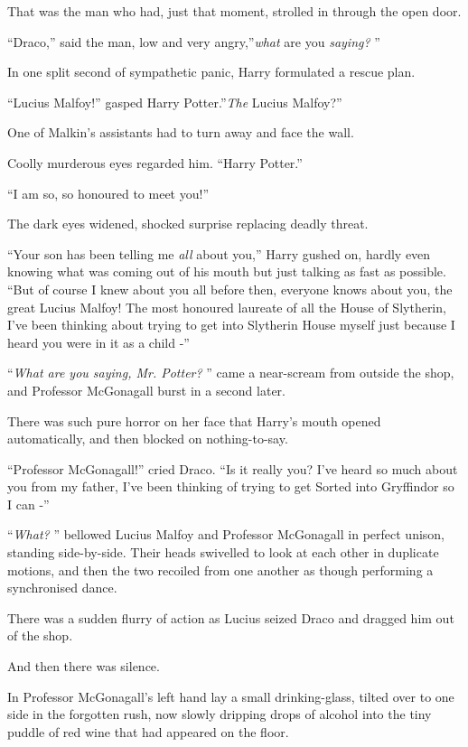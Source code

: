 That was the man who had, just that moment, strolled in through the open
door.

``Draco,'' said the man, low and very angry,''\emph{what} are you
\emph{saying?} ''

In one split second of sympathetic panic, Harry formulated a rescue
plan.

``Lucius Malfoy!'' gasped Harry Potter.''\emph{The} Lucius Malfoy?''

One of Malkin's assistants had to turn away and face the wall.

Coolly murderous eyes regarded him. ``Harry Potter.''

``I am so, so honoured to meet you!''

The dark eyes widened, shocked surprise replacing deadly threat.

``Your son has been telling me \emph{all} about you,'' Harry gushed on,
hardly even knowing what was coming out of his mouth but just talking as
fast as possible. ``But of course I knew about you all before then,
everyone knows about you, the great Lucius Malfoy! The most honoured
laureate of all the House of Slytherin, I've been thinking about trying
to get into Slytherin House myself just because I heard you were in it
as a child -''

``\emph{What are you saying, Mr. Potter?} '' came a near-scream from
outside the shop, and Professor McGonagall burst in a second later.

There was such pure horror on her face that Harry's mouth opened
automatically, and then blocked on nothing-to-say.

``Professor McGonagall!'' cried Draco. ``Is it really you? I've heard so
much about you from my father, I've been thinking of trying to get
Sorted into Gryffindor so I can -''

``\emph{What?} '' bellowed Lucius Malfoy and Professor McGonagall in
perfect unison, standing side-by-side. Their heads swivelled to look at
each other in duplicate motions, and then the two recoiled from one
another as though performing a synchronised dance.

There was a sudden flurry of action as Lucius seized Draco and dragged
him out of the shop.

And then there was silence.

In Professor McGonagall's left hand lay a small drinking-glass, tilted
over to one side in the forgotten rush, now slowly dripping drops of
alcohol into the tiny puddle of red wine that had appeared on the floor.

